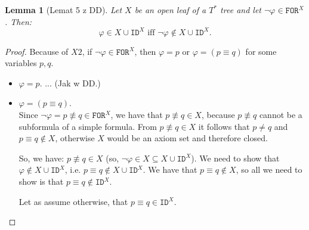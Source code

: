 \documentclass{article}
\newtheorem{lemma}[theorem]{Lemma}
\theoremstyle{definition}
\newcommand*{\Ts}{T^*}
\newcommand*{\eq}{\equiv}
\newcommand*{\FOR}{\texttt{FOR}}
\newcommand*{\FORx}{\texttt{FOR}^X}
\newcommand*{\IDx}{\texttt{ID}^X}
\begin{document}
\begin{lemma}[Lemat 5 z DD]
    Let $X$ be an open leaf of a $\Ts$ tree and let $\lnot \varphi \in \FOR^X$. Then:
    $$
    \varphi \in X \cup \IDx \text{ iff } \lnot \varphi \not \in X \cup \IDx.
    $$
\end{lemma}
\begin{proof}
    Because of $X2$, if $\lnot \varphi \in \FORx$, then $\varphi = p$ or $\varphi = (p \eq q)$ for some variables $p, q$.

    \begin{itemize}
        \item [1°] $\varphi = p$. ... (Jak w DD.)
        \item [2°] $\varphi = (p \eq q)$. \\
            Since $\lnot \varphi = p \not \eq q \in \FORx$, we have that $p \not \eq q \in X$, because $p \not \eq q$ cannot be a subformula of a simple formula. From $p \not \eq q \in X$ it follows that $p \not = q$ and $p \eq q \not \in X$, otherwise $X$ would be an axiom set and therefore closed.

            So, we have: $p \not \eq q \in X$ (so, $\lnot \varphi \in X \subseteq X \cup \IDx$). We need to show that $\varphi \not \in X \cup \IDx$, i.e. $p \eq q \not \in X \cup \IDx$. We have that $p \eq q \not \in X$, so all we need to show is that $p \eq q \not \in \IDx$.
            
            Let as assume otherwise, that $p \eq q \in \IDx$.
            

\end{itemize}
\end{proof}
\end{document}
